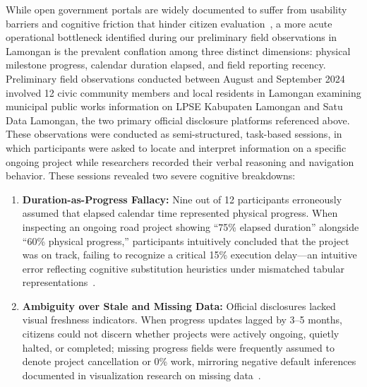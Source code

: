 \documentclass[runningheads]{llncs}
\begin{document}
While open government portals are widely documented to suffer from usability barriers and cognitive friction that hinder citizen evaluation~\cite{nikiforova2021open,zhao2023digital}, a more acute operational bottleneck identified during our preliminary field observations in Lamongan is the prevalent conflation among three distinct dimensions: physical milestone progress, calendar duration elapsed, and field reporting recency. Preliminary field observations conducted between August and September 2024 involved 12 civic community members and local residents in Lamongan examining municipal public works information on LPSE Kabupaten Lamongan and Satu Data Lamongan, the two primary official disclosure platforms referenced above. These observations were conducted as semi-structured, task-based sessions, in which participants were asked to locate and interpret information on a specific ongoing project while researchers recorded their verbal reasoning and navigation behavior. These sessions revealed two severe cognitive breakdowns:
\begin{enumerate}\setlength{\itemsep}{1.2pt}\setlength{\parskip}{0pt}
    \item \textbf{Duration-as-Progress Fallacy:} Nine out of 12 participants erroneously assumed that elapsed calendar time represented physical progress. When inspecting an ongoing road project showing ``75\% elapsed duration'' alongside ``60\% physical progress,'' participants intuitively concluded that the project was on track, failing to recognize a critical 15\% execution delay---an intuitive error reflecting cognitive substitution heuristics under mismatched tabular representations~\cite{bacic2022advancing}.
    \item \textbf{Ambiguity over Stale and Missing Data:} Official disclosures lacked visual freshness indicators. When progress updates lagged by 3--5 months, citizens could not discern whether projects were actively ongoing, quietly halted, or completed; missing progress fields were frequently assumed to denote project cancellation or 0\% work, mirroring negative default inferences documented in visualization research on missing data~\cite{fernstad2022explore}.
\end{enumerate}
\end{document}

